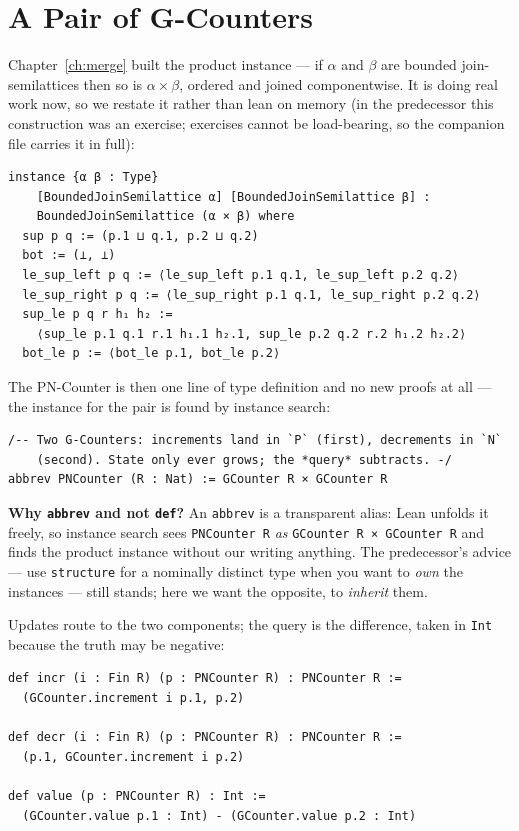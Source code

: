 \documentclass[12pt, a4paper, openright]{book}
\theoremstyle{thmstyle}
\theoremstyle{defstyle}
\newcommand{\lc}[1]{\texttt{#1}}
\newenvironment{notebox}{%
  \begin{tcolorbox}[notebox]%
}{\end{tcolorbox}}
\newcounter{exercise}[chapter]
\begin{document}
\section{A Pair of G-Counters}

Chapter~\ref{ch:merge} built the product instance --- if $\alpha$ and
$\beta$ are bounded join-semilattices then so is $\alpha \times \beta$,
ordered and joined componentwise. It is doing real work now, so we
restate it rather than lean on memory (in the predecessor this
construction was an exercise; exercises cannot be load-bearing, so the
companion file carries it in full):

\begin{verbatim}
instance {α β : Type}
    [BoundedJoinSemilattice α] [BoundedJoinSemilattice β] :
    BoundedJoinSemilattice (α × β) where
  sup p q := (p.1 ⊔ q.1, p.2 ⊔ q.2)
  bot := (⊥, ⊥)
  le_sup_left p q := ⟨le_sup_left p.1 q.1, le_sup_left p.2 q.2⟩
  le_sup_right p q := ⟨le_sup_right p.1 q.1, le_sup_right p.2 q.2⟩
  sup_le p q r h₁ h₂ :=
    ⟨sup_le p.1 q.1 r.1 h₁.1 h₂.1, sup_le p.2 q.2 r.2 h₁.2 h₂.2⟩
  bot_le p := ⟨bot_le p.1, bot_le p.2⟩
\end{verbatim}

The PN-Counter is then one line of type definition and no new proofs at
all --- the instance for the pair is found by instance search:

\begin{verbatim}
/-- Two G-Counters: increments land in `P` (first), decrements in `N`
    (second). State only ever grows; the *query* subtracts. -/
abbrev PNCounter (R : Nat) := GCounter R × GCounter R
\end{verbatim}

\begin{notebox}
  \textbf{Why \lc{abbrev} and not \lc{def}?} An \lc{abbrev} is a
  transparent alias: Lean unfolds it freely, so instance search sees
  \lc{PNCounter R} \emph{as} \lc{GCounter R × GCounter R} and finds the
  product instance without our writing anything. The predecessor's
  advice --- use \lc{structure} for a nominally distinct type when you
  want to \emph{own} the instances --- still stands; here we want the
  opposite, to \emph{inherit} them.
\end{notebox}

Updates route to the two components; the query is the difference, taken
in \lc{Int} because the truth may be negative:

\begin{verbatim}
def incr (i : Fin R) (p : PNCounter R) : PNCounter R :=
  (GCounter.increment i p.1, p.2)

def decr (i : Fin R) (p : PNCounter R) : PNCounter R :=
  (p.1, GCounter.increment i p.2)

def value (p : PNCounter R) : Int :=
  (GCounter.value p.1 : Int) - (GCounter.value p.2 : Int)
\end{verbatim}
\end{document}
